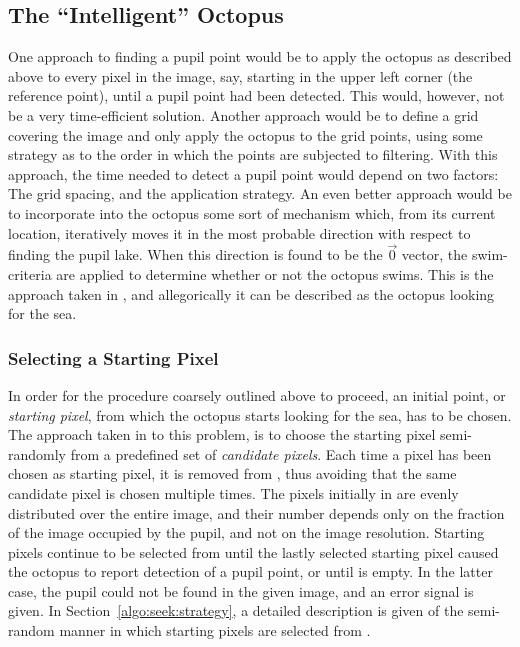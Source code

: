 \subsection{The ``Intelligent'' Octopus}
\label{algo:seek:IQ}

One approach to finding a pupil point would be to apply the octopus as
described above to every pixel in the image, say, starting in the
upper left corner (the reference point), until a pupil point had been
detected.  This would, however, not be a very time-efficient solution.
Another approach would be to define a grid covering the image and only
apply the octopus to the grid points, using some strategy as to the
order in which the points are subjected to filtering.  With this
approach, the time needed to detect a pupil point would depend on two
factors: The grid spacing, and the application strategy.  An even
better approach would be to incorporate into the octopus some sort of
mechanism which, from its current location, iteratively moves it in
the most probable direction with respect to finding the pupil lake.
When this direction is found to be the $\vec{0}$ vector, the
swim-criteria are applied to determine whether or not the octopus
swims.  This is the approach taken in {\octopus}, and allegorically it
can be described as the octopus looking for the sea.

\subsubsection{Selecting a Starting Pixel}

In order for the procedure coarsely outlined above to proceed, an
initial point, or {\em starting pixel\/}, from which the octopus
starts looking for the sea, has to be chosen.  The approach taken in
{\octopus} to this problem, is to choose the starting pixel
semi-randomly from a predefined set {\SS} of {\em candidate pixels\/}.
Each time a pixel has been chosen as starting pixel, it is removed
from {\SS}, thus avoiding that the same candidate pixel is chosen
multiple times.  The pixels initially in {\SS} are evenly distributed
over the entire image, and their number depends only on the fraction
of the image occupied by the pupil, and not on the image resolution.
Starting pixels continue to be selected from {\SS} until the lastly
selected starting pixel caused the octopus to report detection of a
pupil point, or until {\SS} is empty.  In the latter case, the pupil
could not be found in the given image, and an error signal is given.
In Section~\ref{algo:seek:strategy}, a detailed description is given
of the semi-random manner in which starting pixels are selected from
{\SS}.

